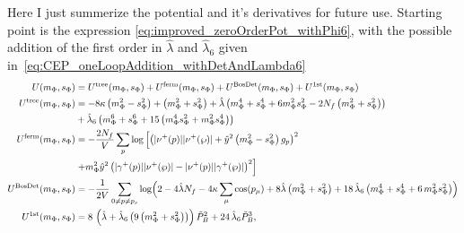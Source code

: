\label{ch:potAndDerivatives}
Here I just summerize the potential and it's derivatives for future use. Starting point is the expression \eqref{eq:improved_zeroOrderPot_withPhi6},
with the possible addition of the first order in $\hat\lambda$ and $\hat\lambda_6$ given in~\eqref{eq:CEP_oneLoopAddition_withDetAndLambda6}
\begin{align}\label{eq:CEP_shortCut}
 U(m_{\Phi}, s_{\Phi}) &= U^{\text{tree}}(m_{\Phi}, s_{\Phi}) + U^{\text{ferm}}(m_{\Phi}, s_{\Phi})
                          + U^{\text{BosDet}}(m_{\Phi}, s_{\Phi}) + U^{\text{1st}}(m_{\Phi}, s_{\Phi})
              \\ \label{CEP_treeLevel}
 U^{\text{tree}}(m_{\Phi}, s_{\Phi}) &= -8 \kappa \left( m_{\Phi}^2 - s_{\Phi}^2 \right)   +   \left( m_{\Phi}^2 + s_{\Phi}^2 \right)
                         + \hat\lambda \left( m_{\Phi}^4 + s_{\Phi}^4 + 6 m_{\Phi}^2 s_{\Phi}^2 - 2 N_f \left(m_{\Phi}^2 + s_{\Phi}^2 \right) \right) 
              \nonumber \\
                         & + \hat\lambda_6 \left( m_{\Phi}^6 + s_{\Phi}^6 + 15 \left( m_{\Phi}^4 s_{\Phi}^2 + m_{\Phi}^2 s_{\Phi}^4 \right)   \right)
              \\ \label{eq:CEP_ferionicContribution}
 U^{\text{ferm}}(m_{\Phi}, s_{\Phi}) &= -\frac{2N_f}{V} \sum\limits_p \log
                                    \left[ \left( |\nu^+(p)| |\nu^+(\wp)|   +
                                    \hat y ^2 \left( m_{\Phi}^2 - s_{\Phi}^2 \right) g_p\right)^2 
                                              \nonumber \right. \\ 
                        & \left. +  m_{\Phi}^2 \hat y^2 \left( |\gamma^+(p)| |\nu^+(\wp)|   -   |\nu^+(p)| |\gamma^+(\wp)| \right)^2\right] 
                                              \\ \label{eq:CEP_bosonicDeterminantContribution}
 U^{\text{BosDet}}(m_{\Phi}, s_{\Phi}) &= - \frac{1}{2V}\sum\limits_{0 \neq p \neq p_s} 
                        \log\Bigl( 2 - 4 \hat\lambda N_f - 4 \kappa \sum_{\mu} \cos(p_{\mu}) + 8 \hat\lambda \left( m_{\Phi}^2 + s_{\Phi}^2  \right) 
                        + 18\, \hat\lambda_6\left( m_{\Phi}^4 + s_{\Phi}^4 + 6\,  m_{\Phi}^2 s_{\Phi}^2 \right)\Bigr)
                                              \\ \label{eq:CEP_bosonicFirstOrderContribution}
 U^{\text{1st}}(m_{\Phi}, s_{\Phi}) & = 8\,\left(\hat \lambda + \hat\lambda_6\left( 9\left( m_{\Phi}^2 + s_{\Phi}^2 \right) \right) \right) \tilde P_B^2
                        + 24\, \hat\lambda_6 \tilde P_B^3,
\end{align}
% 
% 
